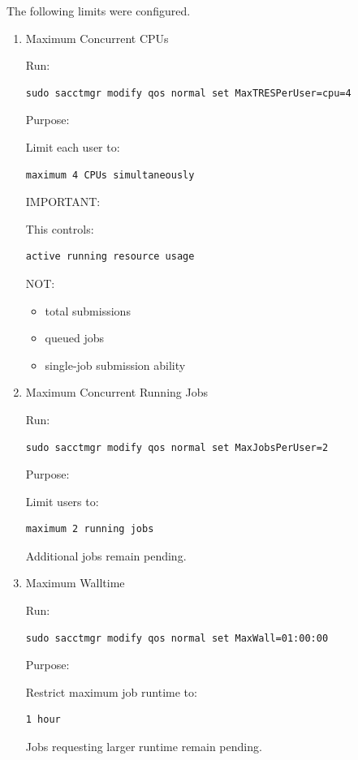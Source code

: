 \documentclass[11pt]{article}
\begin{document}
The following limits were configured.
\begin{enumerate}
\item Maximum Concurrent CPUs
\label{sec:orge54a3cf}

Run:

\begin{verbatim}
sudo sacctmgr modify qos normal set MaxTRESPerUser=cpu=4
\end{verbatim}

Purpose:

Limit each user to:

\begin{verbatim}
maximum 4 CPUs simultaneously
\end{verbatim}

IMPORTANT:

This controls:

\begin{verbatim}
active running resource usage
\end{verbatim}

NOT:

\begin{itemize}
\item total submissions
\item queued jobs
\item single-job submission ability
\end{itemize}
\item Maximum Concurrent Running Jobs
\label{sec:org58980f2}

Run:

\begin{verbatim}
sudo sacctmgr modify qos normal set MaxJobsPerUser=2
\end{verbatim}

Purpose:

Limit users to:

\begin{verbatim}
maximum 2 running jobs
\end{verbatim}

Additional jobs remain pending.
\item Maximum Walltime
\label{sec:orgc067e55}

Run:

\begin{verbatim}
sudo sacctmgr modify qos normal set MaxWall=01:00:00
\end{verbatim}

Purpose:

Restrict maximum job runtime to:

\begin{verbatim}
1 hour
\end{verbatim}

Jobs requesting larger runtime remain pending.
\end{enumerate}
\end{document}
